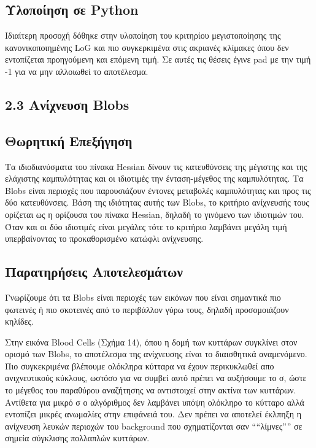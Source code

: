 \documentclass[12pt,a4paper]{article}
\begin{document}
\subsection*{Υλοποίηση σε \foreignlanguage{english}{Python}}
\hspace{0.6cm}Ιδιαίτερη προσοχή δόθηκε στην υλοποίηση του κριτηρίου μεγιστοποίησης της κανονικοποιημένης \foreignlanguage{english}{LoG} και πιο συγκερκιμένα στις ακριανές κλίμακες όπου δεν εντοπίζεται προηγούμενη και επόμενη τιμή. Σε αυτές τις θέσεις έγινε \foreignlanguage{english}{pad} με την τιμή -1 για να μην αλλοιωθεί το αποτέλεσμα.

\subsection*{2.3 Ανίχνευση \foreignlanguage{english}{Blobs}}

\subsection*{Θωρητική Επεξήγηση}
\hspace{0.6cm}Τα ιδιοδιανύσματα του πίνακα \foreignlanguage{english}{Hessian} δίνουν τις κατευθύνσεις της μέγιστης και της ελάχιστης καμπυλότητας και οι ιδιοτιμές την ένταση-μέγεθος της καμπυλότητας. Τα \foreignlanguage{english}{Blobs} είναι περιοχές που παρουσιάζουν έντονες μεταβολές καμπυλότητας και προς τις δύο κατευθύνσεις. Βάση της ιδιότητας αυτής των \foreignlanguage{english}{Blobs}, το κριτήριο ανίχνευσής τους ορίζεται ως η ορίζουσα του πίνακα \foreignlanguage{english}{Hessian}, δηλαδή το γινόμενο των ιδιοτιμών του. Όταν και οι δύο ιδιοτιμές είναι μεγάλες τότε το κριτήριο λαμβάνει μεγάλη τιμή υπερβαίνοντας το προκαθορισμένο κατώφλι ανίχνευσης.

\subsection*{Παρατηρήσεις Αποτελεσμάτων}
\hspace{0.6cm}Γνωρίζουμε ότι τα \foreignlanguage{english}{Blobs} είναι περιοχές των εικόνων που είναι σημαντικά πιο φωτεινές ή πιο σκοτεινές από το περιβάλλον γύρω τους, δηλαδή προσομοιάζουν κηλίδες.

Στην εικόνα \foreignlanguage{english}{Blood Cells} (Σχήμα 14), όπου η δομή των κυττάρων συγκλίνει στον ορισμό των \foreignlanguage{english}{Blobs}, το αποτέλεσμα της ανίχνευσης είναι το διαισθητικά αναμενόμενο. Πιο συγκεκριμένα βλέπουμε ολόκληρα κύτταρα να έχουν περικυκλωθεί απο ανιχνευτικούς κύκλους, ωστόσο για να συμβεί αυτό πρέπει να αυξήσουμε το σ, ώστε το μέγεθος του παραθύρου αναζήτησης να αντιστοιχεί στην ακτίνα των κυττάρων. Αντίθετα για μικρό σ ο αλγόριθμος δεν λαμβάνει υπόψη ολόκληρο το κύτταρο αλλά εντοπίζει μικρές ανωμαλίες στην επιφάνειά του. Δεν πρέπει να αποτελεί έκλπηξη η ανίχνευση λευκών περιοχών του \foreignlanguage{english}{background} που σχηματίζονται σαν ````λίμνες'''' σε σημεία σύγκλισης πολλαπλών κυττάρων.
\end{document}
